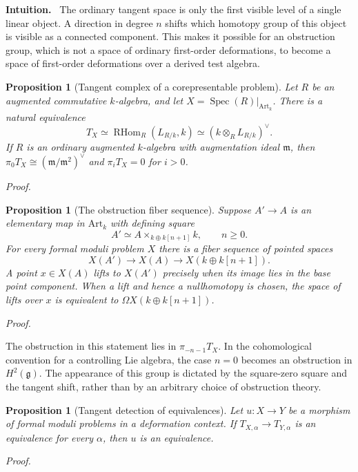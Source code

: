 \documentclass[12pt,letterpaper,oneside]{report}
\newtheorem{proposition}[theorem]{Proposition}
\theoremstyle{definition}
\theoremstyle{remark}
\renewenvironment{proof}[1][Proof]{\par\nopagebreak[4]\addvspace{4pt}\noindent\textit{#1.}\par\nobreak\vspace{0.5\baselineskip}}{\par\addvspace{4pt}}
\newenvironment{intuition}{\par\noindent\textbf{Intuition.}\ }{\par}
\newcommand{\Art}{\mathrm{Art}_k}
\newcommand{\RHom}{\operatorname{RHom}}
\newcommand{\Spec}{\operatorname{Spec}}
\newcommand{\g}{\mathfrak g}
\newcommand{\m}{\mathfrak m}
\begin{document}
\begin{intuition}
The ordinary tangent space is only the first visible level of a single linear object. A direction in degree $n$ shifts which homotopy group of this object is visible as a connected component. This makes it possible for an obstruction group, which is not a space of ordinary first-order deformations, to become a space of first-order deformations over a derived test algebra.
\end{intuition}

\begin{proposition}[Tangent complex of a corepresentable problem]
\label{prop:cotangent-tangent}
Let $R$ be an augmented commutative $k$-algebra, and let $X=\Spec(R)|_{\Art}$. There is a natural equivalence
\[
 T_X\simeq\RHom_R(L_{R/k},k)
       \simeq(k\otimes_R L_{R/k})^\vee.
\]
If $R$ is an ordinary augmented $k$-algebra with augmentation ideal $\m$, then $\pi_0T_X\cong(\m/\m^2)^\vee$ and $\pi_iT_X=0$ for $i>0$.
\end{proposition}
\begin{proof}
\end{proof}


\begin{proposition}[The obstruction fiber sequence]
\label{prop:obstruction}
Suppose $A'\to A$ is an elementary map in $\Art$ with defining square
\[
 A'\simeq A\mathbin{\times}_{k\oplus k[n+1]}k,\qquad n\geq0.
\]
For every formal moduli problem $X$ there is a fiber sequence of pointed spaces
\[
 X(A')\longrightarrow X(A)\longrightarrow X(k\oplus k[n+1]).
\]
A point $x\in X(A)$ lifts to $X(A')$ precisely when its image lies in the base point component. When a lift and hence a nullhomotopy is chosen, the space of lifts over $x$ is equivalent to $\Omega X(k\oplus k[n+1])$.
\end{proposition}
\begin{proof}
\end{proof}


The obstruction in this statement lies in $\pi_{-n-1}T_X$. In the cohomological convention for a controlling Lie algebra, the case $n=0$ becomes an obstruction in $H^2(\g)$. The appearance of this group is dictated by the square-zero square and the tangent shift, rather than by an arbitrary choice of obstruction theory.

\begin{proposition}[Tangent detection of equivalences]
\label{prop:tangent-detection}
Let $u:X\to Y$ be a morphism of formal moduli problems in a deformation context. If $T_{X,\alpha}\to T_{Y,\alpha}$ is an equivalence for every $\alpha$, then $u$ is an equivalence.
\end{proposition}
\begin{proof}
\end{proof}
\end{document}
